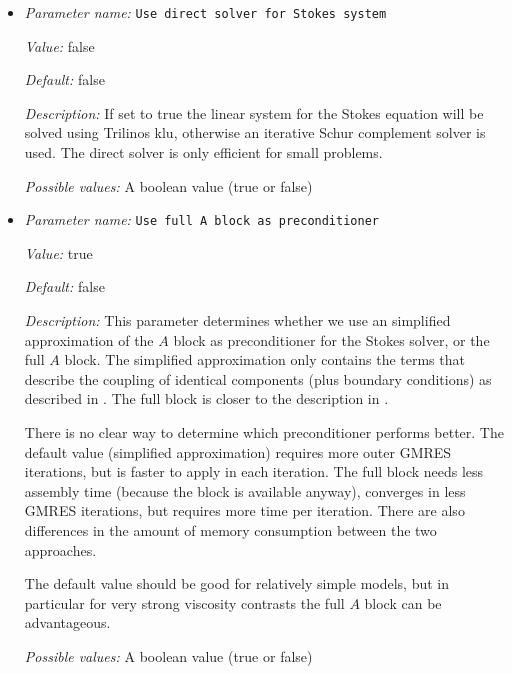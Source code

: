 \begin{itemize}
{\it Value:} block AMG


{\it Default:} block AMG


{\it Possible values:} Any one of block AMG, direct solver, block geometric multigrid
\item {\it Parameter name:} {\tt Use direct solver for Stokes system}
\label{parameters:Solver parameters/Stokes solver parameters/Use direct solver for Stokes system}
\label{parameters:Solver_20parameters/Stokes_20solver_20parameters/Use_20direct_20solver_20for_20Stokes_20system}


{\it Value:} false


{\it Default:} false


{\it Description:} If set to true the linear system for the Stokes equation will be solved using Trilinos klu, otherwise an iterative Schur complement solver is used. The direct solver is only efficient for small problems.


{\it Possible values:} A boolean value (true or false)
\item {\it Parameter name:} {\tt Use full A block as preconditioner}
\label{parameters:Solver parameters/Stokes solver parameters/Use full A block as preconditioner}
\label{parameters:Solver_20parameters/Stokes_20solver_20parameters/Use_20full_20A_20block_20as_20preconditioner}


{\it Value:} true


{\it Default:} false


{\it Description:} This parameter determines whether we use an simplified approximation of the $A$ block as preconditioner for the Stokes solver, or the full $A$ block. The simplified approximation only contains the terms that describe the coupling of identical components (plus boundary conditions) as described in \cite{KHB12}. The full block is closer to the description in \cite{rudi2017weighted}.

There is no clear way to determine which preconditioner performs better. The default value (simplified approximation) requires more outer GMRES iterations, but is faster to apply in each iteration. The full block needs less assembly time (because the block is available anyway), converges in less GMRES iterations, but requires more time per iteration. There are also differences in the amount of memory consumption between the two approaches.

The default value should be good for relatively simple models, but in particular for very strong viscosity contrasts the full $A$ block can be advantageous.


{\it Possible values:} A boolean value (true or false)
\end{itemize}

